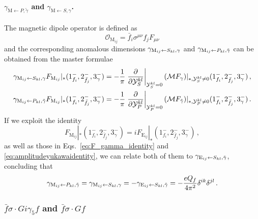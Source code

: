 \paragraph{$\gamma_{\text{M}\leftarrow P,\tilde \gamma}$ and $\gamma_{\text{M}\leftarrow S,\gamma}$.}
The magnetic dipole operator is defined as
\begin{equation}
    \mathcal O_{\text{M}_{ij}} = \bar f_i \sigma^{\mu\nu}f_j F_{\mu\nu}
\end{equation}
and the corresponding anomalous dimensions $\gamma_{\textup{M}_{ij}\leftarrow S_{kl},\gamma}$ and $\gamma_{\textup{M}_{ij}\leftarrow P_{kl},\tilde\gamma}$ can be obtained from the master formulae
\begin{align}
    \gamma_{\textup{M}_{ij}\leftarrow S_{kl},\gamma} F_{\text{M}_{ij}}|_*(1^-_{f_i},2^-_{\bar f_j},3^-_\gamma) &= -\frac{1}{\pi}\left.\frac{\partial}{\partial \mathcal Y_S^{kl}}\right|_{\mathcal Y_S^{kl}=0}(\mathcal M F_{\gamma})|_{*,\mathcal Y_S^{kl}\neq 0}(1^-_{f_i},2^-_{\bar f_j},3^-_\gamma)\,, \\
    \gamma_{\textup{M}_{ij}\leftarrow P_{kl},\tilde\gamma} F_{\text{M}_{ij}}|_*(1^-_{f_i},2^-_{\bar f_j},3^-_\gamma) &= -\frac{1}{\pi}\left.\frac{\partial}{\partial \mathcal Y_P^{kl}}\right|_{\mathcal Y_P^{kl}=0}(\mathcal M F_{\tilde\gamma})|_{*,\mathcal Y_P^{kl}\neq 0}(1^-_{f_i},2^-_{\bar f_j},3^-_\gamma)\,.
\end{align}
If we exploit the identity
\begin{equation}
    F_{\text{M}_{ij}}|_*(1^-_{f_i},2^-_{\bar f_j},3^-_\gamma) =i F_{\text{E}_{ij}}|_*(1^-_{f_i},2^-_{\bar f_j},3^-_\gamma)\,,
\end{equation}
as well as those in Eqs.~\eqref{eq:F_gamma_identity} and \eqref{eq:amplitudeyukawaidentity}, we can relate both of them to $\gamma_{\textup{E}_{ij}\leftarrow S_{kl},\tilde\gamma}$, concluding that
\begin{equation}
    \gamma_{\textup{M}_{ij}\leftarrow P_{kl},\tilde\gamma}=
    \gamma_{\textup{M}_{ij}\leftarrow S_{kl},\gamma} = -
    \gamma_{\textup{E}_{ij}\leftarrow S_{kl},\tilde\gamma} = -\frac{eQ_f }{4\pi^2}\delta^{ik}\delta^{jl}\,.
\end{equation}



\subsubsection{
$\bar f \sigma\!\cdot\! G i\gamma_5 f$
and $\bar f \sigma\!\cdot\! G f$
}
\label{sec:chromoelectric_dipole_moment}

